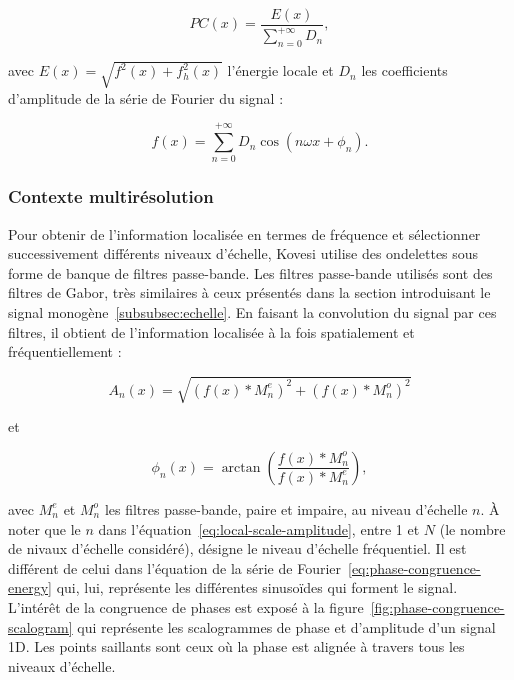 \begin{equation}
    PC(x) = \frac{E(x)}{\sum_{n=0}^{+\infty} D_n},
\end{equation}

\noindent avec $E(x) = \sqrt{f^2(x) + f_h^2(x)}$ l'énergie locale et $D_n$ les coefficients d'amplitude de la série de Fourier du signal :

\begin{equation}
    f(x) = \sum_{n=0}^{+\infty} D_n\cos(n\omega x + \phi_n).
    \label{eq:phase-congruence-energy}
\end{equation}


\subsubsection{Contexte multirésolution}

Pour obtenir de l'information localisée en termes de fréquence et sélectionner successivement différents niveaux d'échelle, Kovesi utilise des ondelettes sous forme de banque de filtres passe-bande. Les filtres passe-bande utilisés sont des filtres de Gabor, très similaires à ceux présentés dans la section introduisant le signal monogène~\ref{subsubsec:echelle}. En faisant la convolution du signal par ces filtres, il obtient de l'information localisée à la fois spatialement et fréquentiellement :

\begin{equation}
    A_n(x) = \sqrt{(f(x)*M^e_n)^2 + (f(x)*M^o_n)^2}
    \label{eq:local-scale-amplitude}
\end{equation}

\noindent et

\begin{equation}
    \phi_n(x) = \arctan\left(\frac{f(x)*M^o_n}{f(x)*M^e_n}\right),
\end{equation}

\noindent avec $M^e_n$ et $M^o_n$ les filtres passe-bande, paire et impaire, au niveau d'échelle $n$. À noter que le $n$ dans l'équation~\ref{eq:local-scale-amplitude}, entre 1 et $N$ (le nombre de nivaux d'échelle considéré), désigne le niveau d'échelle fréquentiel. Il est différent de celui dans l'équation de la série de Fourier~\ref{eq:phase-congruence-energy} qui, lui, représente les différentes sinusoïdes qui forment le signal. L'intérêt de la congruence de phases est exposé à la figure~\ref{fig:phase-congruence-scalogram} qui représente les scalogrammes de phase et d'amplitude d'un signal 1D. Les points saillants sont ceux où la phase est alignée à travers tous les niveaux d'échelle.

